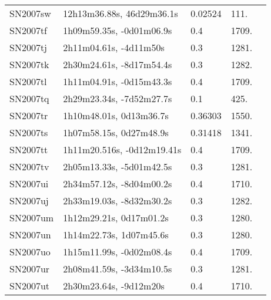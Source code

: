 \begin{longtable}{lllll}
         SN2007sw &      12h13m36.88s, 46d29m36.1s &  0.02524 &           111. &    \citet{1999PASP..111..438F} \\
         SN2007tf &       1h09m59.35s, -0d01m06.9s &      0.4 &          1709. &    \citet{2007CBET.1186A...1C} \\
         SN2007tj &         2h11m04.61s, -4d11m50s &      0.3 &          1281. &    \citet{2007CBET.1186A...1C} \\
         SN2007tk &       2h30m24.61s, -8d17m54.4s &      0.3 &          1282. &    \citet{2007CBET.1186A...1C} \\
         SN2007tl &       1h11m04.91s, -0d15m43.3s &      0.4 &          1709. &    \citet{2007CBET.1186A...1C} \\
         SN2007tq &       2h29m23.34s, -7d52m27.7s &      0.1 &           425. &    \citet{2007CBET.1186A...1C} \\
         SN2007tr &        1h10m48.01s, 0d13m36.7s &  0.36303 &          1550. &    \citet{2016SDSSD.C...0000:} \\
         SN2007ts &        1h07m58.15s, 0d27m48.9s &  0.31418 &          1341. &    \citet{2016SDSSD.C...0000:} \\
         SN2007tt &     1h11m20.516s, -0d12m19.41s &      0.4 &          1709. &    \citet{2007CBET.1186A...1C} \\
         SN2007tv &       2h05m13.33s, -5d01m42.5s &      0.3 &          1281. &    \citet{2007CBET.1186A...1C} \\
         SN2007ui &       2h34m57.12s, -8d04m00.2s &      0.4 &          1710. &    \citet{2007CBET.1186A...1C} \\
         SN2007uj &       2h33m19.03s, -8d32m30.2s &      0.3 &          1282. &    \citet{2007CBET.1186A...1C} \\
         SN2007um &        1h12m29.21s, 0d17m01.2s &      0.3 &          1280. &    \citet{2007CBET.1186A...1C} \\
         SN2007un &        1h14m22.73s, 1d07m45.6s &      0.3 &          1280. &    \citet{2007CBET.1186A...1C} \\
         SN2007uo &       1h15m11.99s, -0d02m08.4s &      0.4 &          1709. &    \citet{2007CBET.1186A...1C} \\
         SN2007ur &       2h08m41.59s, -3d34m10.5s &      0.3 &          1281. &    \citet{2007CBET.1186A...1C} \\
         SN2007ut &         2h30m23.64s, -9d12m20s &      0.4 &          1710. &    \citet{2007CBET.1186A...1C} \\

\end{longtable}
